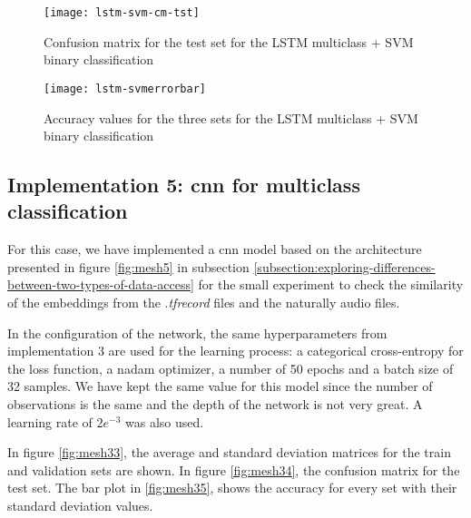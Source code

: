	\begin{figure}[t]
		\centering
		\captionsetup{justification=centering}
		\texttt{[image: lstm-svm-cm-tst]}
		\caption{Confusion matrix for the test set for the LSTM multiclass + SVM binary classification}
		\label{fig:mesh31}
	\end{figure}
	
	\begin{figure}[t]
		\centering
		\captionsetup{justification=centering}
		\texttt{[image: lstm-svmerrorbar]}
		\caption{Accuracy values for the three sets for the LSTM multiclass + SVM binary classification}
		\label{fig:mesh32}
	\end{figure}

	
\subsection{Implementation 5: \acrshort{cnn} for multiclass classification}

	For this case, we have implemented a \acrshort{cnn} model based on the architecture presented in figure \ref{fig:mesh5} in subsection \ref{subsection:exploring-differences-between-two-types-of-data-access} for the small experiment to check the similarity of the embeddings from the .\textit{tfrecord} files and the naturally audio files.
	
	In the configuration of the network, the same hyperparameters from implementation 3 are used for the learning process: a categorical cross-entropy for the loss function, a \acrshort{nadam} optimizer, a number of 50 epochs and a batch size of 32 samples. We have kept the same value for this model since the number of observations is the same and the depth of the network is not very great. A learning rate of $2e^{-3}$ was also used. 
	
	In figure \ref{fig:mesh33}, the average and standard deviation matrices for the train and validation sets are shown. In figure \ref{fig:mesh34}, the confusion matrix for the test set. The bar plot in \ref{fig:mesh35}, shows the accuracy for every set with their standard deviation values.
	
